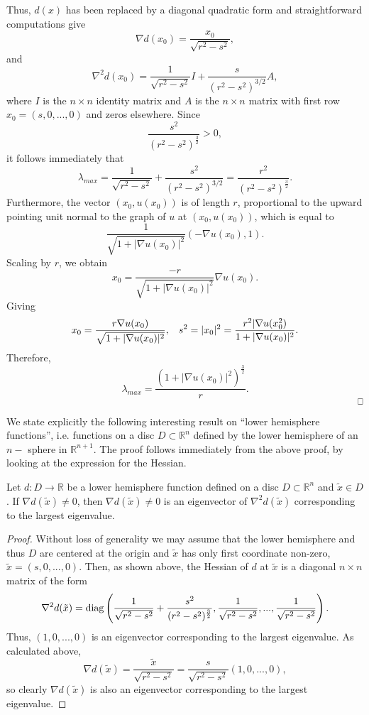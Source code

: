 \documentclass[10pt]{article}
\newenvironment{proposition}[2][Proposition]{\begin{trivlist}
\item[\hskip \labelsep {\bfseries #1}\hskip \labelsep {\bfseries #2.}]}{\end{trivlist}}
\begin{document}
Thus, $d(x)$ has been replaced by a diagonal quadratic form and straightforward computations give $$\nabla d(x_0)= \frac{x_0}{\sqrt{r^2-s^2}},$$ and $$\nabla^2d(x_0)= \frac{1}{\sqrt{r^2-s^2}} I + \frac{s}{(r^2-s^2)^{3/2}} A,$$ where $I$ is the $n\times n$ identity matrix and $A$ is the $n\times n$ matrix with first row $x_0=(s,0,...,0)$ and zeros elsewhere. Since $$\frac{s^2}{(r^2-s^2)^{\frac{3}{2}}}>0,$$
it follows immediately that $$\lambda_{max}=\frac{1}{\sqrt{r^2-s^2}} + \frac{s^2}{(r^2-s^2)^{3/2}}=\frac{r^2}{(r^2-s^2)^{\frac{3}{2}}}.$$
Furthermore, the vector $(x_0,u(x_0))$ is of length $r$, proportional to the upward pointing unit normal to the graph of $u$ at $(x_0,u(x_0))$, which is equal to 
$$\frac{1}{\sqrt{1+|\nabla u(x_0)|^2}}(-\nabla u(x_0),1).$$
Scaling by $r$, we obtain
$$x_0=\frac{-r}{\sqrt{1+|\nabla u(x_0)|^2}}\nabla u(x_0).$$
Giving $$x_0=\dfrac{r \nabla u(x_0)}{\sqrt{1+|\nabla u(x_0)|^2}}, \hspace{3mm} s^2=|x_0|^2=\dfrac{r^2|\nabla u(x_0^2)}{1+|\nabla u(x_0)|^2}.$$
Therefore,
$$\lambda_{max}=\dfrac{(1+|\nabla u(x_0)|^2)^\frac{3}{2}}{r}.$$
$\hspace{165mm} \square$


We state explicitly the following interesting result on \textquotedblleft lower hemisphere functions\textquotedblright, i.e. functions on a disc $D \subset \mathbb{R}^n$ defined by the lower hemisphere of an $n-$ sphere in $\mathbb{R}^{n+1}$. The proof follows immediately from the above proof, by looking at the expression for the Hessian.
\begin{proposition}{2.1}
Let $d:D\rightarrow \mathbb{R}$ be a lower hemisphere function defined on a disc $D\subset \mathbb{R}^n$ and $\tilde{x} \in D$. If $\nabla d(\tilde{x}) \neq 0$, then $\nabla d(\tilde{x}) \neq 0$ is an eigenvector of $\nabla ^2 d(\tilde{x})$ corresponding to the largest eigenvalue.
\end{proposition}
\begin{proof}
Without loss of generality we may assume that the lower hemisphere and thus $D$ are centered at the origin and $\tilde{x}$ has only first coordinate non-zero, $\tilde{x} =(s,0,...,0)$. Then, as shown above, the Hessian of $d$ at $\tilde{x}$ is a diagonal $n\times n$ matrix of the form
$$\nabla ^2 d(\tilde{x})= \textnormal{diag}\left(\frac{1}{\sqrt{r^2-s^2}}+\frac{s^2}{(r^2-s^2)^{\frac{3}{2}}},\frac{1}{\sqrt{r^2-s^2}},...,\frac{1}{\sqrt{r^2-s^2}}\right).$$
Thus, $(1,0,...,0)$ is an eigenvector corresponding to the largest eigenvalue. As calculated above,
$$\nabla d(\tilde{x})= \frac{\tilde{x}}{\sqrt{r^2-s^2}}= \frac{s}{\sqrt{r^2-s^2}} (1,0,...,0) ,$$ so clearly $\nabla d(\tilde{x})$ is also an eigenvector corresponding to the largest eigenvalue.

\end{proof}
\end{document}
